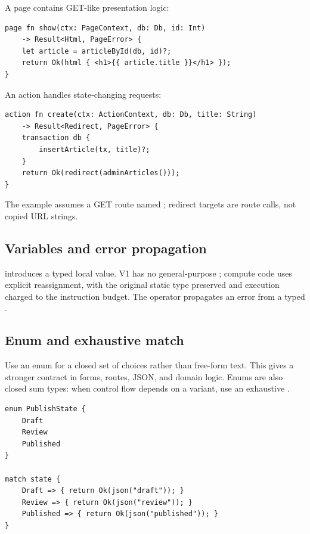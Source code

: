 A page contains GET-like presentation logic:

\begin{lstlisting}[language=RWLang]
page fn show(ctx: PageContext, db: Db, id: Int)
    -> Result<Html, PageError> {
    let article = articleById(db, id)?;
    return Ok(html { <h1>{{ article.title }}</h1> });
}
\end{lstlisting}

An action handles state-changing requests:

\begin{lstlisting}[language=RWLang]
action fn create(ctx: ActionContext, db: Db, title: String)
    -> Result<Redirect, PageError> {
    transaction db {
        insertArticle(tx, title)?;
    }
    return Ok(redirect(adminArticles()));
}
\end{lstlisting}

The example assumes a GET route named ; redirect targets are route calls, not copied URL strings.

\subsection*{Variables and error propagation}

 introduces a typed local value. V1 has no general-purpose ; compute code uses explicit  reassignment, with the original static type preserved and execution charged to the instruction budget. The  operator propagates an error from a typed .

\subsection*{Enum and exhaustive match}

Use an enum for a closed set of choices rather than free-form text. This gives a stronger contract in forms, routes, JSON, and domain logic. Enums are also closed sum types: when control flow depends on a variant, use an exhaustive .

\begin{lstlisting}[language=RWLang]
enum PublishState {
    Draft
    Review
    Published
}

match state {
    Draft => { return Ok(json("draft")); }
    Review => { return Ok(json("review")); }
    Published => { return Ok(json("published")); }
}
\end{lstlisting}

